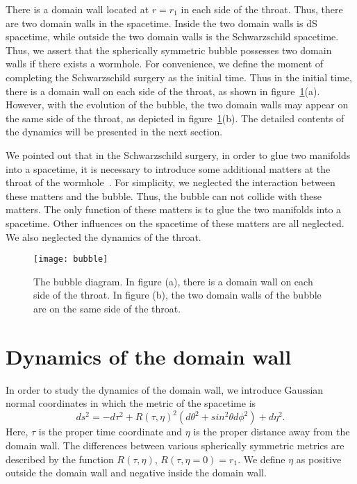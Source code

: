 \documentclass[12pt]{article}
\begin{document}
There is a domain wall located at $r=r_{1}$ in each side of the throat. Thus, there are two domain walls in the spacetime. Inside the two domain walls is dS spacetime, while outside the two domain walls is the Schwarzschild spacetime.  Thus, we assert that the spherically symmetric bubble possesses two domain walls if there exists a wormhole.
For convenience, we define the moment of completing the Schwarzschild surgery as the initial time. Thus in the initial time, there is a domain wall on each side of the throat, as shown in figure~\ref{fig:1}(a). However, with the evolution of the bubble, the two domain walls may appear on the same side of the throat, as depicted in figure~\ref{fig:1}(b). The detailed contents of the dynamics will be presented in the next section.

We pointed out that in the Schwarzschild surgery, in order to glue two manifolds into a spacetime, it is necessary to introduce some additional matters at the throat of the wormhole~\cite{MV,SWK,JFS}. For simplicity, we neglected the interaction between these matters and the bubble. Thus, the bubble can not collide with these matters. The only function of these matters is to glue the two manifolds into a spacetime. Other influences on the spacetime of these matters are all neglected. We also neglected the dynamics of the throat.

\begin{figure}[tbp]
\centering
\texttt{[image: bubble]}
\caption{\label{fig:1} The bubble diagram. In figure (a),  there is a domain wall on each side of the throat. In figure (b), the two domain walls of the bubble are on the same side of the throat. }
\end{figure}





\section{Dynamics of the domain wall}
\label{sec:2}
In order to study the dynamics of the domain wall, we introduce Gaussian normal coordinates in which the metric of the spacetime is~\cite{EAJ,SEA}
\begin{equation}
\label{eq:2.1}%
ds^{2}=-d\tau^{2}+R(\tau,\eta)^{2}(d\theta^{2}+sin^{2} \theta d\phi^{2})+d\eta^{2}.
\end{equation}
Here, $\tau$ is the proper time coordinate and $\eta$ is the proper distance away from the domain wall. The differences between various spherically symmetric metrics are described by the function $R(\tau, \eta)$, $R(\tau, \eta=0)=r_{1}$. We define $\eta$ as positive outside the domain wall and negative inside the domain wall.
\end{document}
